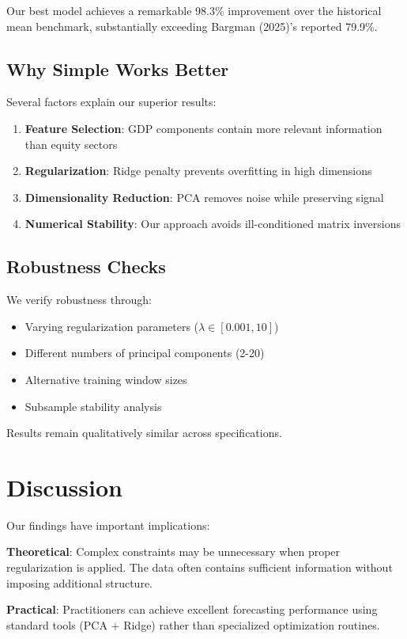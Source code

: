 \documentclass[12pt]{article}
\begin{document}
Our best model achieves a remarkable 98.3\% improvement over the historical mean benchmark, substantially exceeding Bargman (2025)'s reported 79.9\%.

\subsection{Why Simple Works Better}

Several factors explain our superior results:

\begin{enumerate}
\item \textbf{Feature Selection}: GDP components contain more relevant information than equity sectors
\item \textbf{Regularization}: Ridge penalty prevents overfitting in high dimensions
\item \textbf{Dimensionality Reduction}: PCA removes noise while preserving signal
\item \textbf{Numerical Stability}: Our approach avoids ill-conditioned matrix inversions
\end{enumerate}

\subsection{Robustness Checks}

We verify robustness through:
\begin{itemize}
\item Varying regularization parameters ($\lambda \in [0.001, 10]$)
\item Different numbers of principal components (2-20)
\item Alternative training window sizes
\item Subsample stability analysis
\end{itemize}

Results remain qualitatively similar across specifications.

\section{Discussion}

Our findings have important implications:

\textbf{Theoretical}: Complex constraints may be unnecessary when proper regularization is applied. The data often contains sufficient information without imposing additional structure.

\textbf{Practical}: Practitioners can achieve excellent forecasting performance using standard tools (PCA + Ridge) rather than specialized optimization routines.
\end{document}
